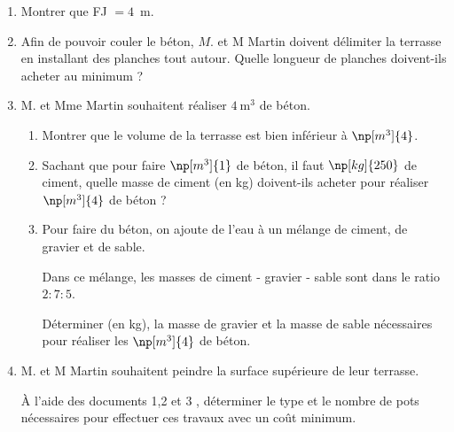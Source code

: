 \documentclass[11pt]{article}
\begin{document}
\begin{enumerate}
	\item Montrer que FJ $= 4$~m.

	\item Afin de pouvoir couler le béton, $M$. et M Martin doivent délimiter la terrasse en installant des planches tout autour. Quelle longueur de planches doivent-ils acheter au minimum ?

	\item M. et Mme Martin souhaitent réaliser $4 \mathrm{~m}^{3}$ de béton.

	\begin{enumerate}
		\item Montrer que le volume de la terrasse est bien inférieur à $\np[m^3]{4}$.

		\item Sachant que pour faire $\np[m^3]{1}$ de béton, il faut $\np[kg]{250}$ de ciment, quelle masse de ciment (en kg) doivent-ils acheter pour réaliser $\np[m^3]{4}$ de béton ?

		\item Pour faire du béton, on ajoute de l'eau à un mélange de ciment, de gravier et de sable.

		Dans ce mélange, les masses de ciment - gravier - sable sont dans le ratio $2: 7: 5$.

		Déterminer (en kg), la masse de gravier et la masse de sable nécessaires pour réaliser les $\np[m^3]{4}$ de béton.
		\end{enumerate}

	\item M. et M Martin souhaitent peindre la surface supérieure de leur terrasse.

À l'aide des documents 1,2 et 3 , déterminer le type et le nombre de pots nécessaires pour effectuer ces travaux avec un coût minimum.

\begin{center}



\end{center}
\end{enumerate}
\end{document}
